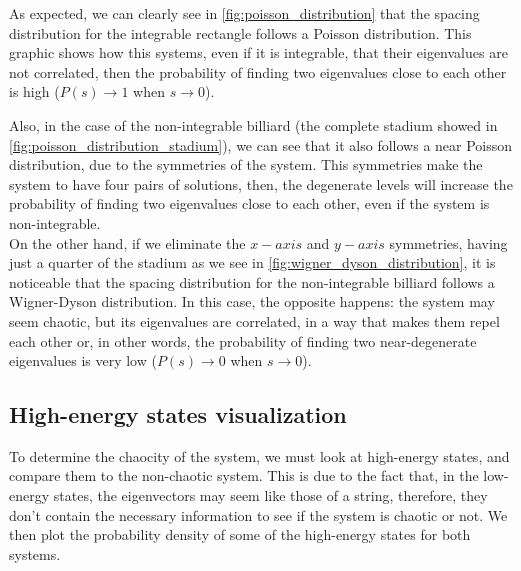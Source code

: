 As expected, we can clearly see in \autoref{fig:poisson_distribution} that the spacing distribution for the integrable rectangle follows a Poisson distribution. This graphic shows how this systems, even if it is integrable, that their eigenvalues are not correlated, then the probability of finding two eigenvalues close to each other is high ($P(s) \rightarrow 1$ when $s \rightarrow 0$). 

Also, in the case of the non-integrable billiard (the complete stadium showed in  \autoref{fig:poisson_distribution_stadium}), we can see that it also follows a near Poisson distribution, due to the symmetries of the system. This symmetries make the system to have four pairs of solutions, then, the degenerate levels will increase the probability of finding two eigenvalues close to each other, even if the system is non-integrable.\\


On the other hand, if we eliminate the $x-axis$ and $y-axis$ symmetries, having just a quarter of the stadium as we see in \autoref{fig:wigner_dyson_distribution}, it is noticeable that the spacing distribution for the non-integrable billiard follows a Wigner-Dyson distribution. In this case, the opposite happens: the system may seem chaotic, but its eigenvalues are correlated, in a way that makes them repel each other or, in other words, the probability of finding two near-degenerate eigenvalues is very low ($P(s) \rightarrow 0$ when $s \rightarrow 0$). \cite{Nakayama2020}


\subsection{High-energy states visualization}

To determine the chaocity of the system, we must look at high-energy states, and compare them to the non-chaotic system. This is due to the fact that, in the low-energy states, the eigenvectors may seem like those of a string, therefore, they don't contain the necessary information to see if the system is chaotic or not. We then plot the probability density of some of the high-energy states for both systems. 

